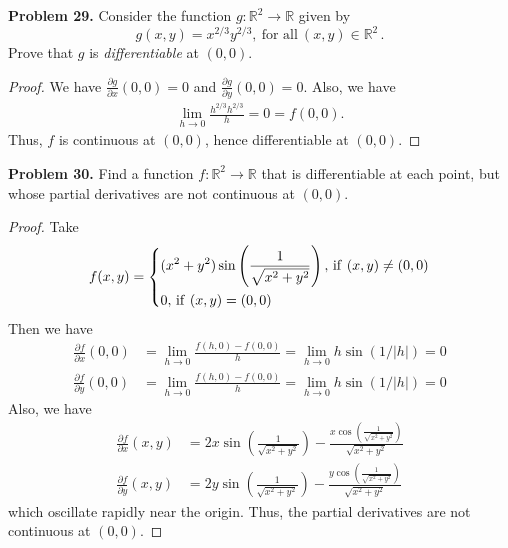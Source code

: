 \documentclass[12pt,leqno]{amsart}
\theoremstyle{definition}
\begin{document}
\medskip

\noindent
{\bf Problem 29.}
Consider the function $g : \mathbb{R}^2 \to \mathbb{R}$ given by
$$
g(x, y) = x^{2/3}y^{2/3}, \ \text{for all} \ (x, y) \in \mathbb{R}^2 \,
.
$$
Prove that $g$ is {\it differentiable} at $(0, 0)$.
\begin{proof}
We have $\frac{\partial g}{\partial x}(0,0) = 0$ and $\frac{\partial g}{\partial y}(0,0) = 0$. Also, we have
\begin{align*}
    \lim_{h\to0} \frac{h^{2/3}h^{2/3}}{h} = 0 = f(0,0).
\end{align*}
Thus, $f$ is continuous at $(0,0)$, hence differentiable at $(0,0)$.
\end{proof}

\medskip

\noindent
{\bf Problem 30.}
Find a function $f:\mathbb{R}^2\to\mathbb{R}$ that is differentiable at each point,
but whose partial derivatives are not continuous at $(0,0)$.
\begin{proof}
Take 
\begin{align*}
    f(x,y) = \left\{
    \begin{aligned}
        & (x^2 + y^2) \sin \left(\frac{1}{\sqrt{x^2 + y^2}}\right),\, {\rm if }\,\, (x,y)\neq (0,0)\\
        & 0, \, {\rm if }\,\, (x,y) = (0,0)
    \end{aligned}
    \right.
\end{align*}
Then we have 
\begin{align*}
    \frac{\partial f}{\partial x}(0,0) & = \lim_{h\to 0} \frac{f(h,0) - f(0,0)}{h} = \lim_{h\to 0} h \sin \left(1/|h|\right) = 0 \\
    \frac{\partial f}{\partial y}(0,0) & = \lim_{h\to 0} \frac{f(h,0) - f(0,0)}{h} = \lim_{h\to 0} h \sin \left(1/|h|\right) = 0 
\end{align*}
Also, we have
\begin{align*}
    \frac{\partial f}{\partial x}(x,y) & = 2x \sin \left(\frac{1}{\sqrt{x^2 + y^2}}\right) - \frac{x \cos \left(\frac{1}{\sqrt{x^2 + y^2}}\right)}{\sqrt{x^2 + y^2}} \\
    \frac{\partial f}{\partial y}(x,y) & = 2y \sin \left(\frac{1}{\sqrt{x^2 + y^2}}\right) - \frac{y \cos \left(\frac{1}{\sqrt{x^2 + y^2}}\right)}{\sqrt{x^2 + y^2}}
\end{align*}
which oscillate rapidly near the origin. Thus, the partial derivatives are not continuous at $(0,0)$.
\end{proof}
\end{document}
